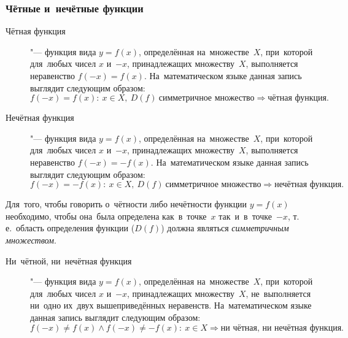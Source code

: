 \documentclass[]{scrartcl}
\begin{document}
\subsubsection{Чётные и~нечётные функции}
\begin{description}
	\item[Чётная функция] "--- функция вида ${\textstyle y=f(x)}$, определённая на~множестве~${\textstyle X}$, при~которой для~любых чисел ${\textstyle x}$ и~${\textstyle -x}$, принадлежащих множеству~${\textstyle X}$, выполняется неравенство ${\textstyle f(-x)=f(x)}$. На~математическом языке данная запись выглядит следующим образом:
	\begin{equation}\label{eq:even-functions}
	f(-x)=f(x):\ x\in X,\ D(f)\ \text{симметричное множество} \Rightarrow \text{чётная функция.}
	\end{equation}
\end{description}
\begin{description}
	\item[Нечётная функция] "--- функция вида ${\textstyle y=f(x)}$, определённая на~множестве~${\textstyle X}$, при~которой для~любых чисел ${\textstyle x}$ и~${\textstyle -x}$, принадлежащих множеству~${\textstyle X}$, выполняется неравенство ${\textstyle f(-x)=-f(x)}$. На~математическом языке данная запись выглядит следующим образом:
	\begin{equation}\label{eq:odd-functions}
	f(-x)=-f(x):\ x\in X,\ D(f)\ \text{симметричное множество} \Rightarrow \text{нечётная функция.}
	\end{equation}
\end{description}
Для~того, чтобы говорить о~чётности либо нечётности функции ${\textstyle y=f(x)}$ необходимо, чтобы она~была определена как~в~точке~${\textstyle x}$ так~и~в~точке~${\textstyle -x}$, т.\,е.~область определения функции (${\textstyle D(f)}$) должна являться \emph{симметричным множеством}.
\begin{description}
	\item[Ни~чётной, ни~нечётная функция] "--- функция вида ${\textstyle y=f(x)}$, определённая на~множестве~${\textstyle X}$, при~которой для~любых чисел ${\textstyle x}$ и~${\textstyle -x}$, принадлежащих множеству~${\textstyle X}$, не~выполняется ни~одно их~двух вышеприведённых неравенств. На~математическом языке данная запись выглядит следующим образом:
	\begin{equation}\label{eq:not-even-not-odd-functions}
	f(-x)\neq f(x)\wedge f(-x)\neq-f(x):\ x\in X \Rightarrow \text{ни~чётная, ни~нечётная функция.}
	\end{equation}
\end{description}
\end{document}

